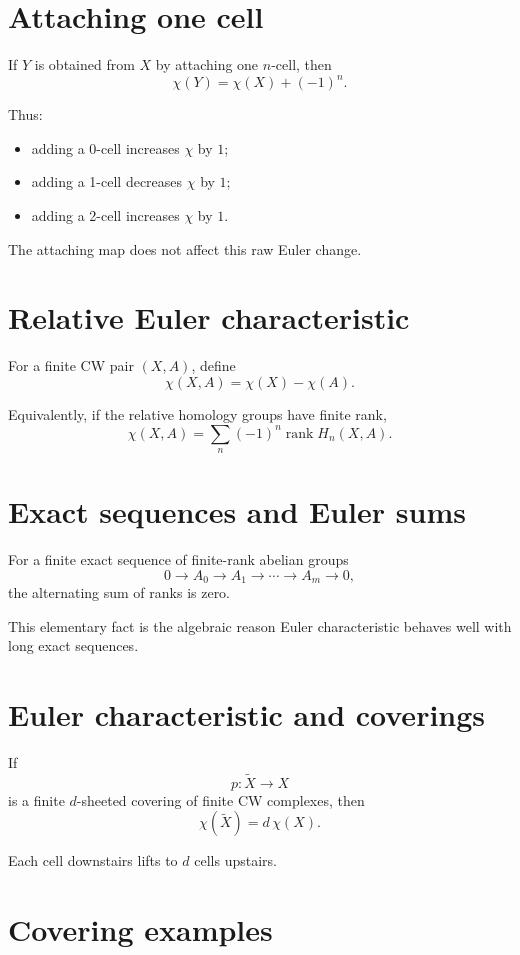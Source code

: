 \section{Attaching one cell}

If \(Y\) is obtained from \(X\) by attaching one \(n\)-cell, then
\[
\chi(Y)=\chi(X)+(-1)^n.
\]

Thus:
\begin{itemize}
\item adding a 0-cell increases \(\chi\) by \(1\);
\item adding a 1-cell decreases \(\chi\) by \(1\);
\item adding a 2-cell increases \(\chi\) by \(1\).
\end{itemize}

The attaching map does not affect this raw Euler change.

\section{Relative Euler characteristic}

For a finite CW pair \((X,A)\), define
\[
\chi(X,A)=\chi(X)-\chi(A).
\]

Equivalently, if the relative homology groups have finite rank,
\[
\chi(X,A)
=
\sum_n(-1)^n\operatorname{rank}H_n(X,A).
\]

\section{Exact sequences and Euler sums}

For a finite exact sequence of finite-rank abelian groups
\[
0\to A_0\to A_1\to\cdots\to A_m\to0,
\]
the alternating sum of ranks is zero.

This elementary fact is the algebraic reason Euler characteristic behaves well
with long exact sequences.

\section{Euler characteristic and coverings}

If
\[
p:\widetilde X\to X
\]
is a finite \(d\)-sheeted covering of finite CW complexes, then
\[
\chi(\widetilde X)=d\,\chi(X).
\]

Each cell downstairs lifts to \(d\) cells upstairs.

\section{Covering examples}

